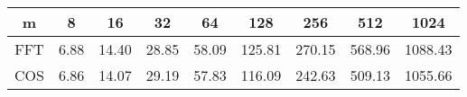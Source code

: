 \begin{minipage}{\textwidth}
\begin{center}
\begin{framed}
\begin{tabular}{c|c|c|c|c|c|c|c|c}
m& 8 & 16 & 32 & 64 & 128 & 256 & 512 & 1024 \\
\hline
FFT & 6.88 & 14.40 & 28.85 & 58.09 & 125.81 & 270.15 & 568.96 & 1088.43 \\
COS & 6.86 & 14.07 & 29.19 & 57.83 & 116.09 & 242.63 & 509.13 &  1055.66\\
\end{tabular}
 \label{table6}
\end{framed}
\end{center}
\end{minipage}